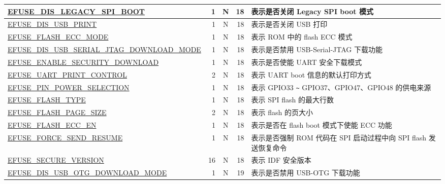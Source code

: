 \begin{longtable}[l]{ |m{8.2cm}|r|c|r|m{9.3cm}| }
    \hline
    \hyperref[fielddesc:EFUSEDISLEGACYSPIBOOT]{EFUSE\_DIS\_LEGACY\_SPI\_BOOT} & 1 & N & 18 & 表示是否关闭 Legacy SPI boot 模式 \\
    \hline
    \hyperref[fielddesc:EFUSEDISUSBPRINT]{EFUSE\_DIS\_USB\_PRINT} & 1 & N & 18 & 表示是否关闭 USB 打印 \\
    \hline 
    \hyperref[fielddesc:EFUSEFLASHECCMODE]{EFUSE\_FLASH\_ECC\_MODE} & 1 & N & 18 & 表示 ROM 中的 flash ECC 模式 \\
    \hline 
    \hyperref[fielddesc:EFUSEDISUSBSERIALJTAGDOWNLOADMODE]{EFUSE\_DIS\_USB\_SERIAL\_JTAG\_DOWNLOAD\_MODE} & 1 & N & 18 & 表示是否禁用 USB-Serial-JTAG 下载功能 \\
    \hline 
    \hyperref[fielddesc:EFUSEENABLESECURITYDOWNLOAD]{EFUSE\_ENABLE\_SECURITY\_DOWNLOAD} & 1 & N & 18 & 表示是否使能 UART 安全下载模式 \\
    \hline
    \hyperref[fielddesc:EFUSEUARTPRINTCONTROL]{EFUSE\_UART\_PRINT\_CONTROL} & 2 & N & 18 & 表示 UART boot 信息的默认打印方式 \\
    \hline
    \hyperref[fielddesc:EFUSEPINPOWERSELECTION]{EFUSE\_PIN\_POWER\_SELECTION} & 1 & N & 18 & 表示 GPIO33 \verb+~+ GPIO37、GPIO47、GPIO48 的供电来源 \\
    \hline
    \hyperref[fielddesc:EFUSEFLASHTYPE]{EFUSE\_FLASH\_TYPE} & 1 & N & 18 & 表示 SPI flash 的最大行数 \\
    \hline
    \hyperref[fielddesc:EFUSEFLASHPAGESIZE]{EFUSE\_FLASH\_PAGE\_SIZE} & 2 & N & 18 & 表示 flash 的页大小 \\
    \hline
    \hyperref[fielddesc:EFUSEFLASHECCEN]{EFUSE\_FLASH\_ECC\_EN} & 1 & N & 18 & 表示是否在 flash boot 模式下使能 ECC 功能 \\
    \hline
    \hyperref[fielddesc:EFUSEFORCESENDRESUME]{EFUSE\_FORCE\_SEND\_RESUME}  & 1 & N & 18 & 表示是否强制 ROM 代码在 SPI 启动过程中向 SPI flash 发送恢复命令 \\  
    \hline
    \hyperref[fielddesc:EFUSESECUREVERSION]{EFUSE\_SECURE\_VERSION}& 16 & N & 18 & 表示 IDF 安全版本 \\\hline
    \hyperref[fielddesc:EFUSEDISUSBOTGDOWNLOADMODE]{EFUSE\_DIS\_USB\_OTG\_DOWNLOAD\_MODE}  & 1 & N & 19 & 表示是否禁用 USB-OTG 下载功能 \\\hline
\end{longtable}
